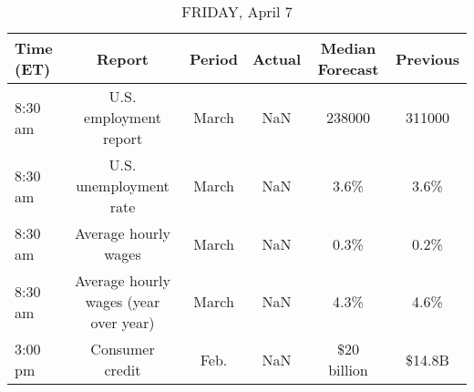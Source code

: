 \documentclass{article}%
\begin{document}
\begin{table}[htbp]%
\caption{FRIDAY, April 7}%
\centering%
\begin{adjustbox}{width=1\textwidth}%
\begin{tabular}{lccccc}
\toprule
Time (ET) &                                Report & Period & Actual & Median Forecast & Previous \\
\midrule
  8:30 am &                U.S. employment report &  March &    NaN &          238000 &   311000 \\
  8:30 am &                U.S. unemployment rate &  March &    NaN &            3.6\% &     3.6\% \\
  8:30 am &                  Average hourly wages &  March &    NaN &            0.3\% &     0.2\% \\
  8:30 am & Average hourly wages (year over year) &  March &    NaN &            4.3\% &     4.6\% \\
  3:00 pm &                       Consumer credit &   Feb. &    NaN &     \$20 billion &   \$14.8B \\
\bottomrule
\end{tabular}
%
\end{adjustbox}%
\end{table}
\end{document}
